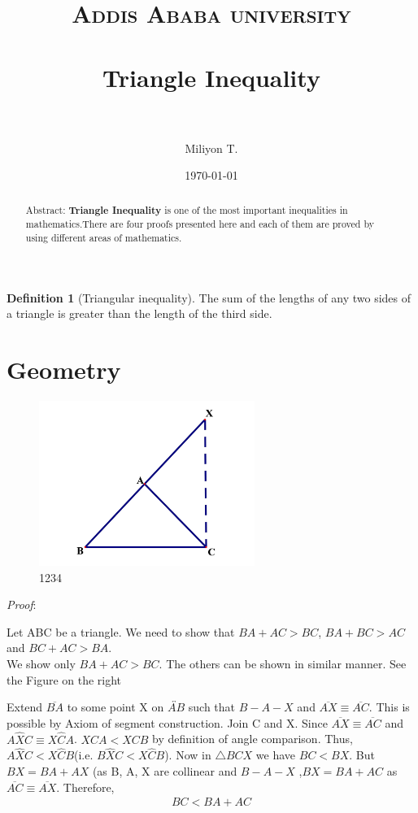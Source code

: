 \documentclass[paper=a4, fontsize=12pt]{scrartcl} %
\title{	
\normalfont \normalsize
\textsc{Addis Ababa university} \\ [25pt] %
\horrule{0.5pt} \\[0.4cm] %
\huge Triangle Inequality \\ %
\horrule{2pt} \\[0.5cm] %
}
\author{Miliyon T.} %
\date{\normalsize\today} %
\theoremstyle{definition}
\newtheorem{defn}[thm]{Definition}
\numberwithin{equation}{section} %
\numberwithin{figure}{section} %
\numberwithin{table}{section} %
\begin{document}
\maketitle %


\begin{abstract}
  Abstract: \textbf{Triangle Inequality} is one of the most important inequalities in mathematics.There are four proofs presented here and each of them are proved
  by using different areas of mathematics.
\end{abstract}

\begin{defn}[Triangular inequality]
 The sum of the lengths of any two sides of a triangle is greater than the length of the third side.
\end{defn}
\section{Geometry}
\begin{figure}
\includegraphics[width=7cm]{7.jpg}
\caption{1234}\label{wrap-fig:1}
\end{figure}
\textit{Proof}:

Let ABC be a triangle. We need to show that $BA + AC > BC$,
$BA + BC > AC$ and $BC + AC > BA$. \\We show only $BA + AC > BC$. The others can be shown in similar manner. See the Figure on the right

Extend $\overline{BA}$  to some point X on $\overleftrightarrow{AB}$ such that $B-A-X$  and
$\overline{AX} \equiv \overline{AC}$. This is possible by Axiom of segment construction.
Join C and X.  Since $\overline{AX} \equiv \overline{AC}$ and $A\hat{X}C\equiv X\hat{C}A$.  $XCA<XCB$ by definition
of angle comparison.  Thus, $A\hat{X}C<X\hat{C}B$(i.e. $B\hat{X}C<X\hat{C}B$).
Now in $\triangle BCX$ we have $BC < BX$.
But $BX = BA + AX$ (as B, A, X are collinear and $B-A-X$ ,$ BX = BA + AC$  as $\overline{AC}\equiv \overline{AX}$.
Therefore,
\begin{align*}
BC < BA + AC
\end{align*}
\end{document}
